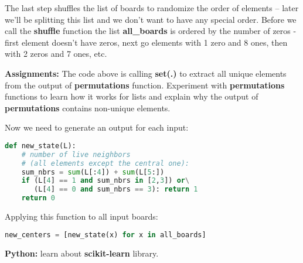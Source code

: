 The last step shuffles the list of boards to randomize the
order of elements  -- later we'll be splitting
this list and we don't want to have any special order. 
Before we call the \textbf{shuffle} function the list \textbf{all_boards}
is ordered by the number of zeros - first element doesn't have
zeros, next go elements with 1 zero and 8 ones, then with 2 zeros and
7 ones, etc.

\begin{tcolorbox}
\textbf{Assignments:} The code above is calling \textbf{set(.)} 
to extract all unique elements from the output of \textbf{permutations}
function. Experiment with \textbf{permutations} functions
to learn how it works for lists and explain why the output of
\textbf{permutations} contains non-unique elements.
\end{tcolorbox}

Now we need to generate an output for each input:

\begin{lstlisting}[language=Python,style=codelst2,caption={New state for the central element of a board 3x3}]
def new_state(L):
    # number of live neighbors
    # (all elements except the central one):
    sum_nbrs = sum(L[:4]) + sum(L[5:])
    if (L[4] == 1 and sum_nbrs in [2,3]) or\
       (L[4] == 0 and sum_nbrs == 3): return 1
    return 0
\end{lstlisting}
Applying this function to all input boards:

\begin{lstlisting}[language=Python,style=codelst2,caption={New states for all boards}]
new_centers = [new_state(x) for x in all_boards]
\end{lstlisting}

\begin{tcolorbox}
\textbf{Python:} learn about \textbf{scikit-learn} library.
\end{tcolorbox}




